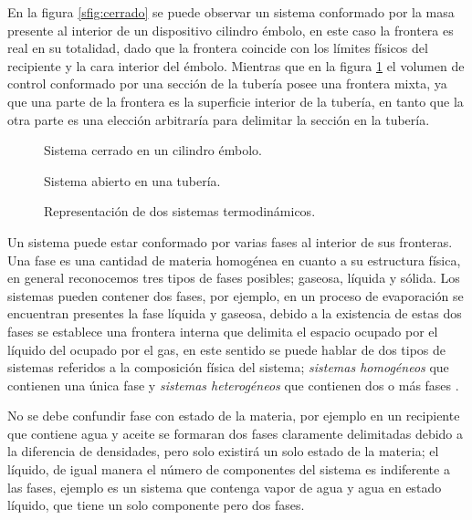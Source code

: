 \documentclass[../master.tex]{subfiles}
\begin{document}
En la figura \ref{sfig:cerrado} se puede observar un sistema conformado por la masa presente al interior de un dispositivo cilindro émbolo, en este caso la frontera es real en su totalidad, dado que la frontera coincide con los límites físicos del recipiente y la cara interior del émbolo. Mientras que en la figura \ref{sfig:abierto} el volumen de control conformado por una sección de la tubería posee una frontera mixta, ya que una parte de la frontera es la superficie interior de la tubería, en tanto que la otra parte es una elección arbitraría para delimitar la sección en la tubería.

\begin{figure}[htbp]
    \centering
    \begin{subcaptionblock}{0.4\linewidth}
        \centering
        
        \caption{Sistema cerrado en un cilindro émbolo.}
        \label{sfig:cerrado}
    \end{subcaptionblock}
    \begin{subcaptionblock}{0.4\linewidth}
        \centering
        
        \caption{Sistema abierto en una tubería.}
        \label{sfig:abierto}
    \end{subcaptionblock}
    \caption{Representación de dos sistemas termodinámicos.}
\end{figure}

Un sistema puede estar conformado por varias fases al interior de sus fronteras. Una fase es una cantidad de materia homogénea en cuanto a su estructura física, en general reconocemos tres tipos de fases posibles; gaseosa, líquida y sólida. Los sistemas pueden contener dos fases, por ejemplo, en un proceso de evaporación se encuentran presentes la fase líquida y gaseosa, debido a la existencia de estas dos fases se establece una frontera interna que delimita el espacio ocupado por el líquido del ocupado por el gas, en este sentido se puede hablar de dos tipos de sistemas referidos a la composición física del sistema; \emph{sistemas homogéneos} que contienen una única fase y \emph{sistemas heterogéneos} que contienen dos o más fases \parencites{wark}{glasstone}.

No se debe confundir fase con estado de la materia, por ejemplo en un recipiente que contiene agua y aceite se formaran dos fases claramente delimitadas debido a la diferencia de densidades, pero solo existirá un solo estado de la materia; el líquido, de igual manera el número de componentes del sistema es indiferente a las fases, ejemplo es un sistema que contenga vapor de agua y agua en estado líquido, que tiene un solo componente pero dos fases.
\end{document}
